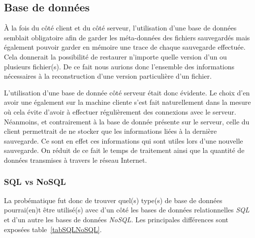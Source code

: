\documentclass[a4paper,10pt, twoside]{report}
\begin{document}
\begin{spacing}{1.2}
\subsection{Base de données}
À la fois du côté client et du côté serveur, l'utilisation d'une
base de données semblait obligatoire afin de garder les méta-données
des fichiers sauvegardés mais également pouvoir garder en mémoire une
trace de chaque sauvegarde effectuée. Cela donnerait la possibilité
de restaurer n'importe quelle version d'un ou plusieurs fichier(s). De ce fait
nous aurions donc l'ensemble des informations nécessaires à la
reconstruction d'une version particulière d'un fichier.

L'utilisation d'une base de donnée côté serveur était donc évidente.
Le choix d'en avoir une également sur la machine cliente s'est fait
naturellement dans la mesure où cela évite d'avoir à effectuer
régulièrement des connexions avec le serveur. Néanmoins, et contrairement
à la base de donnée présente sur le serveur, celle du client permettrait
de ne stocker que les informations liées à la dernière sauvegarde. Ce
sont en effet ces informations qui sont utiles lors d'une nouvelle sauvegarde.
On réduit de ce fait le temps de traitement ainsi que la quantité de
données transmises à travers le réseau Internet.

\subsubsection{SQL vs NoSQL}
La probématique fut donc de trouver quel(s) type(s) de base de données
pourrai(en)t être utilisé(s) avec d'un côté les bases de données
relationnelles \textit{SQL} et d'un autre les bases de données \textit{NoSQL}.
Les principales différences sont exposées table~\ref{tabSQLNoSQL}.


\end{spacing}
\end{document}
